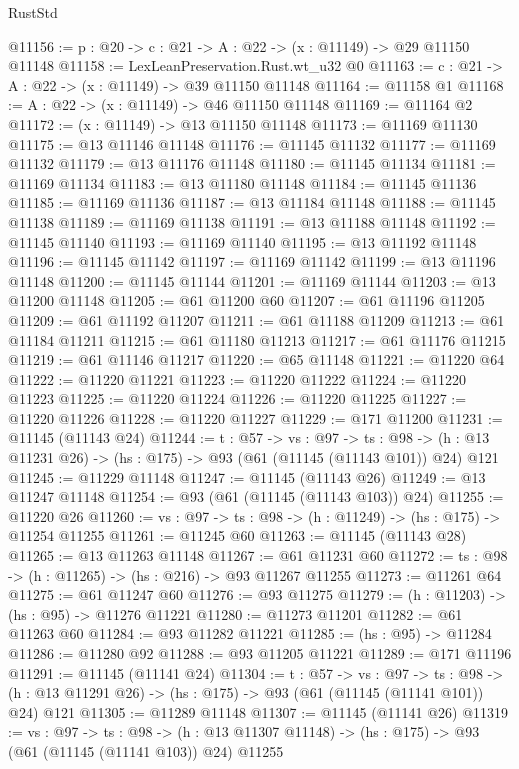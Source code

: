 \begin{lexlean}{RustStd}
\begin{coremodule}
@11156 := {p : @20} -> {c : @21} -> {A : @22} -> (x : @11149) -> @29 @11150 @11148
@11158 := LexLeanPreservation.Rust.wt_u32 @0
@11163 := {c : @21} -> {A : @22} -> (x : @11149) -> @39 @11150 @11148
@11164 := @11158 @1
@11168 := {A : @22} -> (x : @11149) -> @46 @11150 @11148
@11169 := @11164 @2
@11172 := (x : @11149) -> @13 @11150 @11148
@11173 := @11169 @11130
@11175 := @13 @11146 @11148
@11176 := @11145 @11132
@11177 := @11169 @11132
@11179 := @13 @11176 @11148
@11180 := @11145 @11134
@11181 := @11169 @11134
@11183 := @13 @11180 @11148
@11184 := @11145 @11136
@11185 := @11169 @11136
@11187 := @13 @11184 @11148
@11188 := @11145 @11138
@11189 := @11169 @11138
@11191 := @13 @11188 @11148
@11192 := @11145 @11140
@11193 := @11169 @11140
@11195 := @13 @11192 @11148
@11196 := @11145 @11142
@11197 := @11169 @11142
@11199 := @13 @11196 @11148
@11200 := @11145 @11144
@11201 := @11169 @11144
@11203 := @13 @11200 @11148
@11205 := @61 @11200 @60
@11207 := @61 @11196 @11205
@11209 := @61 @11192 @11207
@11211 := @61 @11188 @11209
@11213 := @61 @11184 @11211
@11215 := @61 @11180 @11213
@11217 := @61 @11176 @11215
@11219 := @61 @11146 @11217
@11220 := @65 @11148
@11221 := @11220 @64
@11222 := @11220 @11221
@11223 := @11220 @11222
@11224 := @11220 @11223
@11225 := @11220 @11224
@11226 := @11220 @11225
@11227 := @11220 @11226
@11228 := @11220 @11227
@11229 := @171 @11200
@11231 := @11145 (@11143 @24)
@11244 := {t : @57} ->
  {vs : @97} ->
  {ts : @98} -> (h : @13 @11231 @26) -> (hs : @175) -> @93 (@61 (@11145 (@11143 @101)) @24) @121
@11245 := @11229 @11148
@11247 := @11145 (@11143 @26)
@11249 := @13 @11247 @11148
@11254 := @93 (@61 (@11145 (@11143 @103)) @24)
@11255 := @11220 @26
@11260 := {vs : @97} -> {ts : @98} -> (h : @11249) -> (hs : @175) -> @11254 @11255
@11261 := @11245 @60
@11263 := @11145 (@11143 @28)
@11265 := @13 @11263 @11148
@11267 := @61 @11231 @60
@11272 := {ts : @98} -> (h : @11265) -> (hs : @216) -> @93 @11267 @11255
@11273 := @11261 @64
@11275 := @61 @11247 @60
@11276 := @93 @11275
@11279 := (h : @11203) -> (hs : @95) -> @11276 @11221
@11280 := @11273 @11201
@11282 := @61 @11263 @60
@11284 := @93 @11282 @11221
@11285 := (hs : @95) -> @11284
@11286 := @11280 @92
@11288 := @93 @11205 @11221
@11289 := @171 @11196
@11291 := @11145 (@11141 @24)
@11304 := {t : @57} ->
  {vs : @97} ->
  {ts : @98} -> (h : @13 @11291 @26) -> (hs : @175) -> @93 (@61 (@11145 (@11141 @101)) @24) @121
@11305 := @11289 @11148
@11307 := @11145 (@11141 @26)
@11319 := {vs : @97} ->
  {ts : @98} ->
  (h : @13 @11307 @11148) -> (hs : @175) -> @93 (@61 (@11145 (@11141 @103)) @24) @11255

\end{coremodule}
\end{lexlean}
